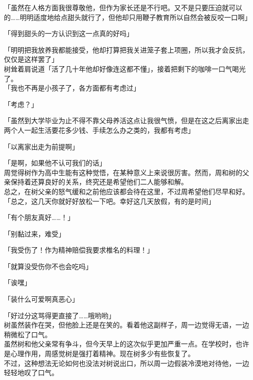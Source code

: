 「虽然在人格方面我很尊敬他，但作为家长还是不行吧。又不是只要压迫就可以的……明明适度地给点甜头就行了，但他却只用鞭子教育所以自然会被反咬一口啊」

「得到甜头的一方认识到这一点真的好吗」

「明明把我放养我都能接受，他却打算把我关进笼子套上项圈，所以我才会反抗，仅仅是这样罢了」\\

树耸着肩说道「活了几十年他却好像连这都不懂」，接着把剩下的咖啡一口气喝光了。\\

「我也不再是小孩子了，各方面都有考虑过」

「考虑？」

「虽然到大学毕业为止不得不靠父母养活这点让我很气愤，但是在这之后离家出走两个人一起生活要花多少钱、手续怎么办之类的，我都有考虑」

「以离家出走为前提啊」

「是啊，如果他不认可我们的话」\\

周觉得树作为高中生能有这种觉悟，在某种意义上来说很厉害。然而，周和树的父亲保持着还算良好的关系，终究还是希望他们二人能够和解。\\

总之，在树父亲的怒气缓和之前他应该都会待在这里，不过周希望他们尽早和好。\\

「总之，这几天你就好好放松一下吧。幸好这几天放假，有的是时间」

「有个朋友真好……！」

「别黏过来，难受」

「我受伤了！作为精神赔偿我要求椎名的料理！」

「就算没受伤你不也会吃吗」

「诶嘿」

「装什么可爱啊真恶心」

「好过分这骂得更直接了……哦哟哟」\\

树虽然装作在哭，但他脸上还是在笑的。看着他这副样子，周一边觉得无语，一边稍微松了口气。\\

虽然树和他父亲常有争斗，但今天早上的这次似乎更加严重一点。在学校时，也许是心理作用，周感觉树是强打着精神。现在树多少有些恢复了。\\

不过，这种想法无论如何也没法对树说出口，所以周一边假装冷漠地对待他，一边轻轻地叹了口气。\\

